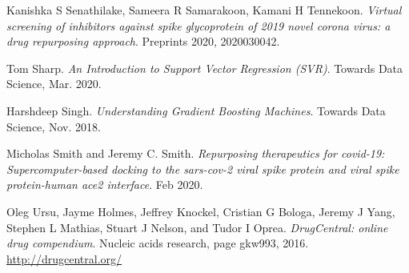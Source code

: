 \documentclass[11pt]{article}
\begin{document}
\begin{thebibliography}{9}
Kanishka S Senathilake, Sameera R Samarakoon, Kamani H Tennekoon.
\textit{Virtual screening of inhibitors against spike glycoprotein of 2019 novel corona virus: a drug repurposing approach}.
Preprints 2020, 2020030042.

Tom Sharp.
\textit{An Introduction to Support Vector Regression (SVR)}.
Towards Data Science, Mar. 2020.

Harshdeep Singh.
\textit{Understanding Gradient Boosting Machines}.
Towards Data Science, Nov. 2018.

Micholas Smith and Jeremy C. Smith.
\textit{Repurposing therapeutics for covid-19: Supercomputer-based docking to the sars-cov-2 viral spike protein and viral spike protein-human ace2 interface}.
Feb 2020.

Oleg Ursu, Jayme Holmes, Jeffrey Knockel, Cristian G Bologa, Jeremy J Yang, Stephen L Mathias, Stuart J Nelson, and Tudor I Oprea.
\textit{DrugCentral: online drug compendium}.
Nucleic acids research, page gkw993, 2016.
\url{http://drugcentral.org/}

\end{thebibliography}  
 
  
\end{document}
